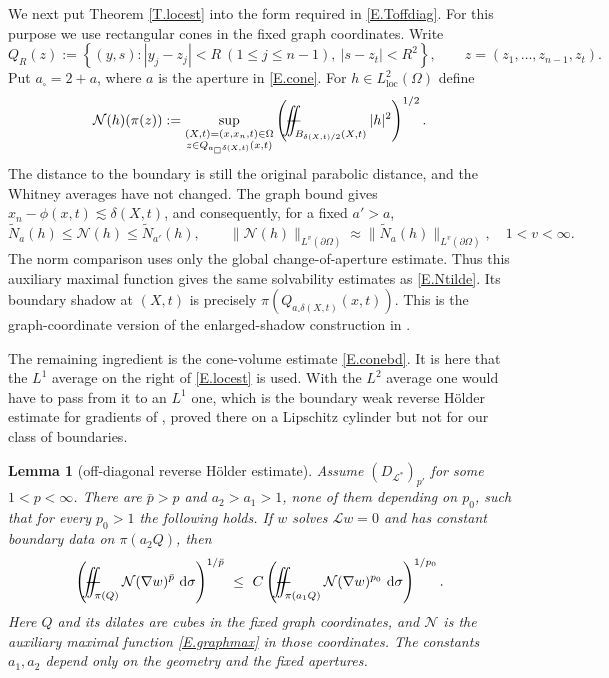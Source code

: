\documentclass[12pt,leqno]{amsart}
\numberwithin{equation}{section}
\DeclareMathOperator{\loc}{loc}
\newcommand{\set}[1]{\left\{#1\right\}}
\newcommand{\om}{\Omega}
\newcommand{\pom}{\partial\Omega}
\newcommand{\LL}{\mathcal L}
\newcommand{\Nt}{\widetilde N}
\renewcommand{\d}{\,\mathrm d}
\def\Yint#1{\mathchoice
	{\YYint\displaystyle\textstyle{#1}}%
	{\YYint\textstyle\scriptstyle{#1}}%
	{\YYint\scriptstyle\scriptscriptstyle{#1}}%
	{\YYint\scriptscriptstyle\scriptscriptstyle{#1}}%
	\!\dint}
\newcommand{\dint}{\int\!\!\!\!\!\int}
\def\YYint#1#2#3{{\setbox0=\hbox{$#1{#2#3}{\iint}$}
		\vcenter{\hbox{$#2#3$}}\kern-.51\wd0}}
\def\longdash{\mkern-1.5mu{-}\mkern-7.5mu{-}}
\def\fiint{\Yint\longdash}
\theoremstyle{plain}
\newtheorem{lemma}[equation]{Lemma}
\theoremstyle{remark}
\begin{document}
We next put Theorem \ref{T.locest} into the form required in
\eqref{E.Toffdiag}. For this purpose we use rectangular cones in the fixed
graph coordinates. Write
\[
 Q_R(z):=\set{(y,s):|y_j-z_j|<R\ (1\le j\le n-1),\ |s-z_t|<R^2},
 \qquad z=(z_1,\dots,z_{n-1},z_t).
\]
Put $a_\square=2+a$, where $a$ is the aperture in \eqref{E.cone}. For
$h\in L^2_{\loc}(\om)$ define
\begin{equation}\label{E.graphmax}
 \mathcal N(h)(\pi(z)):=
 \sup_{\substack{(X,t)=(x,x_n,t)\in\om\\z\in Q_{a_\square\delta(X,t)}(x,t)}}
 \left(\fiint_{B_{\delta(X,t)/2}(X,t)}|h|^2\right)^{1/2}.
\end{equation}
The distance to the boundary is still the original parabolic distance, and
the Whitney averages have not changed. The graph bound gives
$x_n-\phi(x,t)\lesssim\delta(X,t)$, and consequently, for a fixed $a'>a$,
\begin{equation}\label{E.graphmaxcompare}
 \Nt_a(h)\le\mathcal N(h)\le\Nt_{a'}(h),\qquad
 \|\mathcal N(h)\|_{L^v(\pom)}\approx\|\Nt_a(h)\|_{L^v(\pom)},
 \quad 1<v<\infty.
\end{equation}
The norm comparison uses only the global change-of-aperture estimate. Thus
this auxiliary maximal function gives the same solvability estimates as
\eqref{E.Ntilde}. Its boundary shadow at $(X,t)$ is precisely
$\pi(Q_{a_\square\delta(X,t)}(x,t))$. This is the graph-coordinate version of the
enlarged-shadow construction in \cite[\S2.1]{DN}.

The remaining ingredient is the cone-volume estimate \eqref{E.conebd}.
It is here that the $L^1$ average on the right of
\eqref{E.locest} is used. With the $L^2$ average one would have to pass from
it to an $L^1$ one, which is the boundary weak reverse H\"older estimate for
gradients of \cite[Lemma 3.6]{DN}, proved there on a Lipschitz cylinder but not for our class of boundaries.

\begin{lemma}[off-diagonal reverse H\"older estimate]\label{L.offdiag}
Assume $(D_{\LL^*})_{p'}$ for some $1<p<\infty$. There are $\bar p>p$ and
$a_2>a_1>1$, none of them depending on $p_0$, such that for every $p_0>1$ the
following holds. If $w$ solves $\LL w=0$ and has constant boundary data on
$\pi(a_2Q)$, then
\begin{equation}\label{E.Nreverse}
 \left(\fiint_{\pi(Q)}\mathcal N(\nabla w)^{\bar p}\,\d\sigma\right)^{1/\bar p}
 \ \le\ C
 \left(\fiint_{\pi(a_1Q)}\mathcal N(\nabla w)^{p_0}\,\d\sigma\right)^{1/p_0}.
\end{equation}
Here $Q$ and its dilates are cubes in the fixed graph coordinates, and
$\mathcal N$ is the auxiliary maximal function \eqref{E.graphmax} in those
coordinates. The constants $a_1,a_2$ depend only on the geometry and the
fixed apertures.
\end{lemma}
\end{document}
